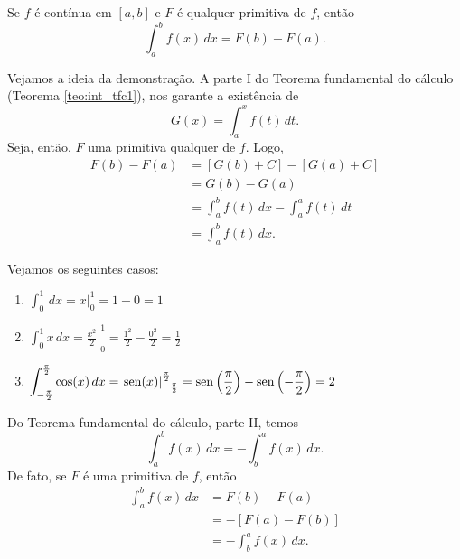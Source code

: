 \begin{teo}\label{teo:int_tfc2}
  Se $f$ é contínua em $[a, b]$ e $F$ é qualquer primitiva de $f$, então
  \begin{equation}
    \int_a^b f(x)\,dx = F(b) - F(a).
  \end{equation}
\end{teo}
\begin{dem}
  Vejamos a ideia da demonstração. A parte I do Teorema fundamental do cálculo (Teorema \ref{teo:int_tfc1}), nos garante a existência de
  \begin{equation}
    G(x) = \int_a^x f(t)\,dt.
  \end{equation}
  Seja, então, $F$ uma primitiva qualquer de $f$. Logo,
  \begin{align}
    F(b) - F(a) &= [G(b) + C] - [G(a) + C] \\
                &= G(b) - G(a) \\
                &= \int_a^b f(t)\,dx - \int_a^a f(t)\,dt \\
                &= \int_a^b f(t)\,dx.
  \end{align}
\end{dem}

\begin{ex}
  Vejamos os seguintes casos:
  \begin{enumerate}
  \item $\displaystyle \int_0^1 \,dx = \left. x \right|_0^1 = 1 - 0 = 1$
  \item $\displaystyle \int_0^1 x\,dx = \left.\frac{x^2}{2}\right|_0^1 = \frac{1^2}{2}-\frac{0^2}{2} = \frac{1}{2}$
  \item $\displaystyle \int_{-\frac{\pi}{2}}^{\frac{\pi}{2}} \cos(x)\,dx = \left.\operatorname{sen}(x)\right|_{-\frac{\pi}{2}}^{\frac{\pi}{2}} = \operatorname{sen}\left(\frac{\pi}{2}\right) - \operatorname{sen}\left(-\frac{\pi}{2}\right) = 2$
  \end{enumerate}
\end{ex}

\begin{obs}
  Do Teorema fundamental do cálculo, parte II, temos
  \begin{equation}
    \int_a^b f(x)\,dx = - \int_b^a f(x)\,dx.
  \end{equation}
  De fato, se $F$ é uma primitiva de $f$, então
  \begin{align}
    \int_a^b f(x)\,dx &= F(b) - F(a) \\
                      &= - \left[F(a) - F(b)\right] \\
                      &= - \int_b^a f(x)\,dx.
  \end{align}
\end{obs}

